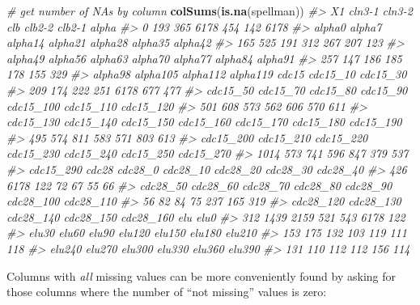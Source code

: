 \documentclass[]{book}
\newenvironment{Shaded}{\begin{snugshade}}{\end{snugshade}}
\newcommand{\CommentTok}[1]{\textcolor[rgb]{0.56,0.35,0.01}{\textit{#1}}}
\newcommand{\KeywordTok}[1]{\textcolor[rgb]{0.13,0.29,0.53}{\textbf{#1}}}
\newcommand{\NormalTok}[1]{#1}
\theoremstyle{definition}
\theoremstyle{definition}
\theoremstyle{definition}
\theoremstyle{remark}
\begin{document}
\begin{Shaded}
\begin{Highlighting}[]
\CommentTok{# get number of NAs by column}
\KeywordTok{colSums}\NormalTok{(}\KeywordTok{is.na}\NormalTok{(spellman))}
\CommentTok{#>        X1    cln3-1    cln3-2       clb    clb2-2    clb2-1     alpha }
\CommentTok{#>         0       193       365      6178       454       142      6178 }
\CommentTok{#>    alpha0    alpha7   alpha14   alpha21   alpha28   alpha35   alpha42 }
\CommentTok{#>       165       525       191       312       267       207       123 }
\CommentTok{#>   alpha49   alpha56   alpha63   alpha70   alpha77   alpha84   alpha91 }
\CommentTok{#>       257       147       186       185       178       155       329 }
\CommentTok{#>   alpha98  alpha105  alpha112  alpha119     cdc15  cdc15_10  cdc15_30 }
\CommentTok{#>       209       174       222       251      6178       677       477 }
\CommentTok{#>  cdc15_50  cdc15_70  cdc15_80  cdc15_90 cdc15_100 cdc15_110 cdc15_120 }
\CommentTok{#>       501       608       573       562       606       570       611 }
\CommentTok{#> cdc15_130 cdc15_140 cdc15_150 cdc15_160 cdc15_170 cdc15_180 cdc15_190 }
\CommentTok{#>       495       574       811       583       571       803       613 }
\CommentTok{#> cdc15_200 cdc15_210 cdc15_220 cdc15_230 cdc15_240 cdc15_250 cdc15_270 }
\CommentTok{#>      1014       573       741       596       847       379       537 }
\CommentTok{#> cdc15_290     cdc28   cdc28_0  cdc28_10  cdc28_20  cdc28_30  cdc28_40 }
\CommentTok{#>       426      6178       122        72        67        55        66 }
\CommentTok{#>  cdc28_50  cdc28_60  cdc28_70  cdc28_80  cdc28_90 cdc28_100 cdc28_110 }
\CommentTok{#>        56        82        84        75       237       165       319 }
\CommentTok{#> cdc28_120 cdc28_130 cdc28_140 cdc28_150 cdc28_160       elu      elu0 }
\CommentTok{#>       312      1439      2159       521       543      6178       122 }
\CommentTok{#>     elu30     elu60     elu90    elu120    elu150    elu180    elu210 }
\CommentTok{#>       153       175       132       103       119       111       118 }
\CommentTok{#>    elu240    elu270    elu300    elu330    elu360    elu390 }
\CommentTok{#>       131       110       112       112       156       114}
\end{Highlighting}
\end{Shaded}

Columns with \emph{all} missing values can be more conveniently found by
asking for those columns where the number of ``not missing'' values is
zero:
\end{document}
